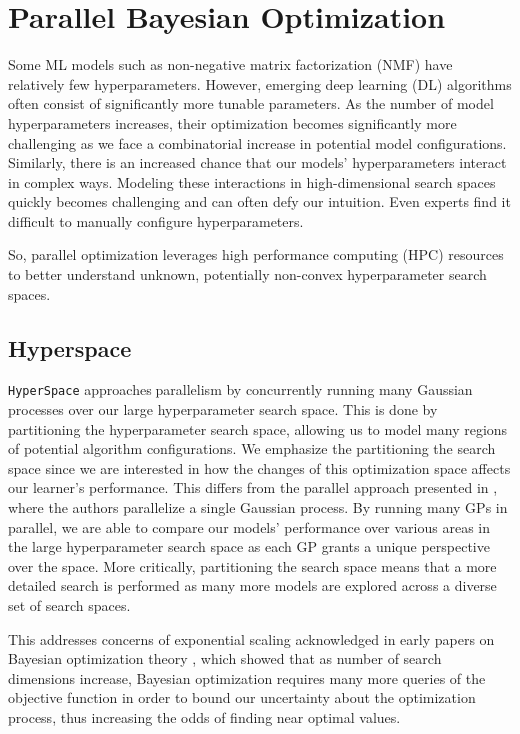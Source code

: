 \section{Parallel Bayesian Optimization}\label{sec:parallel-bo}
Some ML models such as non-negative matrix factorization (NMF) have relatively few hyperparameters. 
However, emerging deep learning (DL) algorithms often consist of significantly more tunable parameters. 
As the number of model hyperparameters increases, their optimization becomes significantly more challenging as we face a combinatorial increase in potential model configurations. 
Similarly, there is an increased chance that our models' hyperparameters interact in complex ways. 
Modeling these interactions in high-dimensional search spaces quickly becomes challenging and can often defy our intuition. 
Even experts find it difficult to manually configure hyperparameters.

So, parallel optimization leverages high performance computing (HPC) resources to better understand unknown, potentially non-convex hyperparameter search spaces.

\subsection{Hyperspace}
\texttt{HyperSpace}\cite{YoungHRK18} approaches\textcolor{white}{i}parallelism by concurrently running many Gaussian processes over our large hyperparameter search space. 
This is done by partitioning the hyperparameter search space, allowing us to model many regions of potential algorithm configurations. 
We emphasize the partitioning the search space since we are interested in how the changes of this optimization space affects our learner’s performance. 
This differs from the parallel approach presented in \cite{SnoekLA12}, where the authors parallelize a single Gaussian process. 
By running many GPs in parallel, we are able to compare our models' performance over various areas in the large hyperparameter search space as each GP grants a unique perspective over the
space. 
More critically, partitioning the search space means that a more detailed search is performed as many more models are explored across a diverse set of search spaces.

This addresses concerns of exponential scaling acknowledged in early papers on Bayesian optimization theory \cite{pmlr-v9-grunewalder10a} \cite{Srinivas.2012}, which showed that as number of search dimensions increase, Bayesian optimization requires many more queries of the objective function in order to bound our uncertainty about the optimization process, thus increasing the odds of finding near optimal values.


